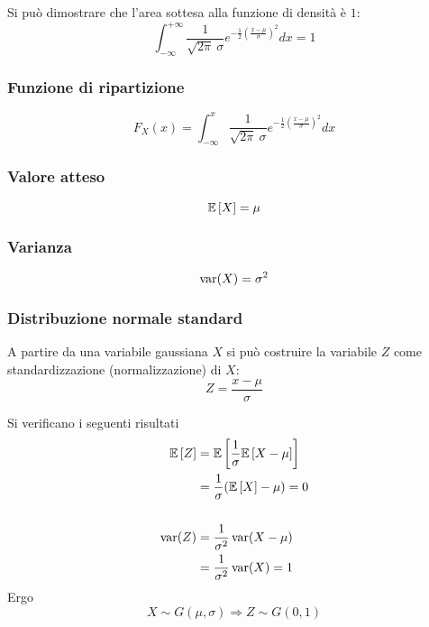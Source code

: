 Si può dimostrare che l'area sottesa alla funzione di densità è $1$:
\begin{equation*}
	\int_{-\infty}^{+\infty} \frac{1}{\sqrt{2\pi}~\sigma} e^{-\frac{1}{2}\left(\frac{x-\mu}{\sigma}\right)^2} dx = 1
\end{equation*}


\subsubsection{Funzione di ripartizione}
\begin{equation*}
	F_X(x) = \int_{-\infty}^x \frac{1}{\sqrt{2\pi}~\sigma} e^{-\frac{1}{2}\left(\frac{x-\mu}{\sigma}\right)^2} dx
\end{equation*}


\subsubsection{Valore atteso}
\begin{equation*}
	\mathbb{E}\left[ X \right] = \mu
\end{equation*}


\subsubsection{Varianza}
\begin{equation*}
	\operatorname{var}(X) = \sigma^2
\end{equation*}


\subsubsection{Distribuzione normale standard}
A partire da una variabile gaussiana $X$ si può costruire la variabile $Z$ come standardizzazione (normalizzazione) di $X$:
\begin{equation*}
	Z = \frac{x-\mu}{\sigma}
\end{equation*}

\noindent
Si verificano i seguenti risultati
\begin{align*}
	\mathbb{E}\left[ Z \right]  & = \mathbb{E}\left[ \frac{1}{\sigma}\mathbb{E}\left[ X-\mu \right] \right]  \\
	        & = \frac{1}{\sigma}(\mathbb{E}\left[ X \right]-\mu) = 0 \\
	\\
	\operatorname{var}(Z) & = \frac{1}{\sigma^2} \operatorname{var}(X-\mu)   \\
	        & = \frac{1}{\sigma^2}\operatorname{var}(X) = 1
\end{align*}
Ergo
\begin{equation*}
	X\sim G(\mu,\sigma) \Rightarrow Z\sim G(0,1)
\end{equation*}

